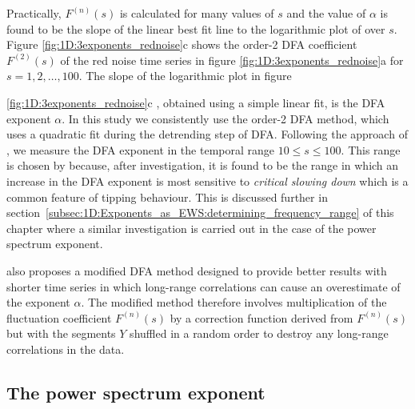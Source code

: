 Practically, $F^{(n)}(s)$ is calculated for many values of $s$ and the value of $\alpha$ is found to be the slope of the linear best fit line to the logarithmic plot of  over $s$. Figure \ref{fig:1D:3exponents_rednoise}c shows the order-2 DFA coefficient $F^{(2)}(s)$ of the red noise time series in figure \ref{fig:1D:3exponents_rednoise}a for $s = 1,2,\dots,100$. The slope of the logarithmic plot in figure {\ref{fig:1D:3exponents_rednoise}c , obtained using a simple linear fit, is the DFA exponent $\alpha$. In this study we consistently use the order-2 DFA method, which uses a quadratic fit during the detrending step of DFA. Following the approach of \cite{livina2007}, we measure the DFA exponent in the temporal range $10\leq s \leq 100$. {\Red This range is chosen by \cite{livina2007} because, after investigation, it is found to be the range in which an increase in the DFA exponent is most sensitive to \emph{critical slowing down} which is a common feature of tipping behaviour. This is discussed further in section~\ref{subsec:1D:Exponents_as_EWS:determining_frequency_range} of this chapter where a similar investigation is carried out in the case of the power spectrum exponent.}
	
\citet{kantelhardt2001} also proposes a modified DFA method designed to provide better results with shorter time series in which long-range correlations can cause an overestimate of the exponent $\alpha$. The modified method therefore involves multiplication of the  fluctuation coefficient $F^{(n)}(s)$ by a correction function derived from $F^{(n)}(s)$ but with the segments $Y$ shuffled in a random order to destroy any long-range correlations in the data. 







\subsection{The power spectrum exponent}
\label{subsec:1D:scaling_exponents:PS}

{}

}
